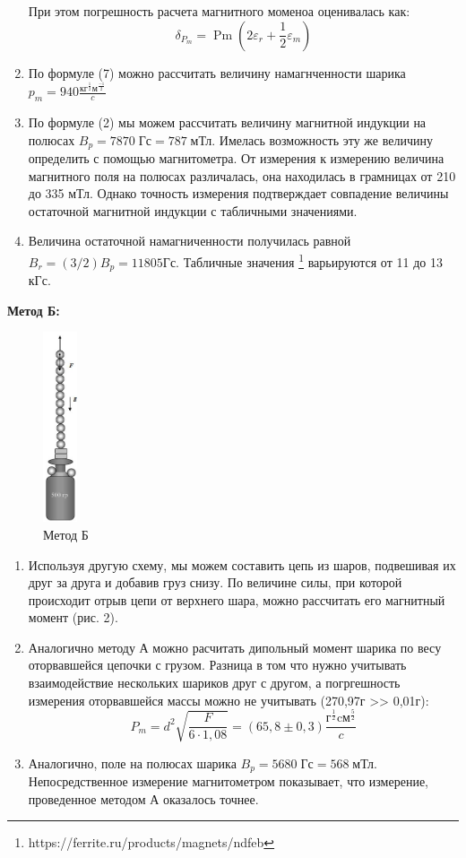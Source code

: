 \documentclass[a4paper, 12pt]{article}
\begin{document}
\begin{enumerate}
    При этом погрешность расчета магнитного моменоа оценивалась как:
    \begin{displaymath} \delta_{P_{m}}=\operatorname{Pm}\left(2 \varepsilon_{r}+\frac{1}{2} \varepsilon_{m}\right) \end{displaymath}
    \item По формуле (7) можно рассчитать величину намагнченности шарика $p_{m} = 940 \frac{\text{кг}^{\frac{1}{2}} \text{м}^{\frac{-1}{2}}}{c}$
    \item По формуле (2) мы можем рассчитать величину магнитной индукции на полюсах  $B_{p} = 7870 \; \text{Гс} = 787 \; \text{мТл}$. Имелась возможность эту же величину определить с помощью магнитометра. От измерения к измерению величина магнитного поля на полюсах различалась, она находилась в грамницах от 210 до 335 мТл. Однако точность измерения подтверждает совпадение величины остаточной магнитной индукции с табличными значениями.
    \item Величина остаточной намагниченности получилась равной $B_{r}= (3 / 2) B_{p} = 11805 \text{Гс}$. Табличные значения \footnote{https://ferrite.ru/products/magnets/ndfeb} варьируются от 11 до 13 кГс.
\end{enumerate}

\textbf{Метод Б:}
\begin{figure}
\includegraphics[width=1cm]{Метод Б.png}
\caption{Метод Б}
\end{figure}
\begin{enumerate}
    \item Используя другую схему, мы можем составить цепь из шаров, подвешивая их друг за друга и добавив груз снизу. По величине силы, при которой происходит отрыв цепи от верхнего шара, можно рассчитать его магнитный момент (рис. 2).
    \item Аналогично методу А можно расчитать дипольный момент шарика по весу оторвавшейся цепочки с грузом. Разница в том что нужно учитывать взаимодействие нескольких шариков друг с другом, а погргешность измерения оторвавшейся массы можно не учитывать (270,97г >> 0,01г):
    \begin{displaymath} P_{m}=d^{2} \sqrt{\frac{F}{6 \cdot 1,08}} = (65,8 \pm 0,3)  \frac{\text{г}^{\frac{1}{2}} \text{cм}^{\frac{5}{2}}}{c}  \end{displaymath}
    \item Аналогично, поле на полюсах шарика  $B_{p} = 5680 \; \text{Гс} = 568\; \text{мТл}$. Непосредственное измерение магнитометром показывает, что измерение, проведенное методом А оказалось точнее.
\end{enumerate}
\end{document}
